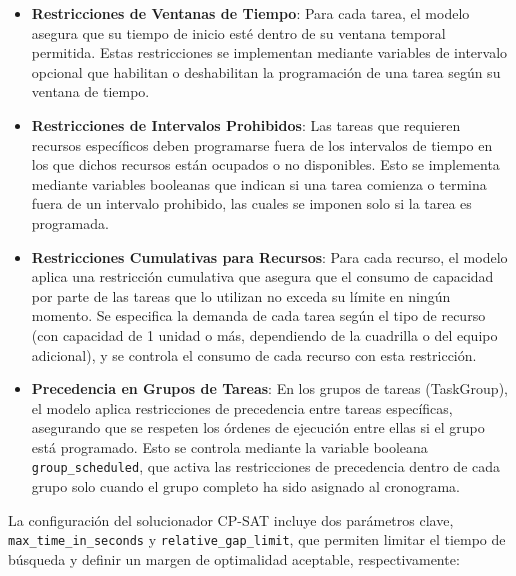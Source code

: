 \documentclass{article}
\begin{document}
\begin{itemize}
    \item \textbf{Restricciones de Ventanas de Tiempo}: Para cada tarea, el modelo asegura que su tiempo de inicio esté dentro de su ventana temporal permitida. Estas restricciones se implementan mediante variables de intervalo opcional que habilitan o deshabilitan la programación de una tarea según su ventana de tiempo.

    \item \textbf{Restricciones de Intervalos Prohibidos}: Las tareas que requieren recursos específicos deben programarse fuera de los intervalos de tiempo en los que dichos recursos están ocupados o no disponibles. Esto se implementa mediante variables booleanas que indican si una tarea comienza o termina fuera de un intervalo prohibido, las cuales se imponen solo si la tarea es programada.

    \item \textbf{Restricciones Cumulativas para Recursos}: Para cada recurso, el modelo aplica una restricción cumulativa que asegura que el consumo de capacidad por parte de las tareas que lo utilizan no exceda su límite en ningún momento. Se especifica la demanda de cada tarea según el tipo de recurso (con capacidad de 1 unidad o más, dependiendo de la cuadrilla o del equipo adicional), y se controla el consumo de cada recurso con esta restricción.

    \item \textbf{Precedencia en Grupos de Tareas}: En los grupos de tareas (TaskGroup), el modelo aplica restricciones de precedencia entre tareas específicas, asegurando que se respeten los órdenes de ejecución entre ellas si el grupo está programado. Esto se controla mediante la variable booleana \texttt{group\_scheduled}, que activa las restricciones de precedencia dentro de cada grupo solo cuando el grupo completo ha sido asignado al cronograma.
\end{itemize}

La configuración del solucionador CP-SAT incluye dos parámetros clave, \texttt{max\_time\_in\_seconds} y \texttt{relative\_gap\_limit}, que permiten limitar el tiempo de búsqueda y definir un margen de optimalidad aceptable, respectivamente:
\end{document}
